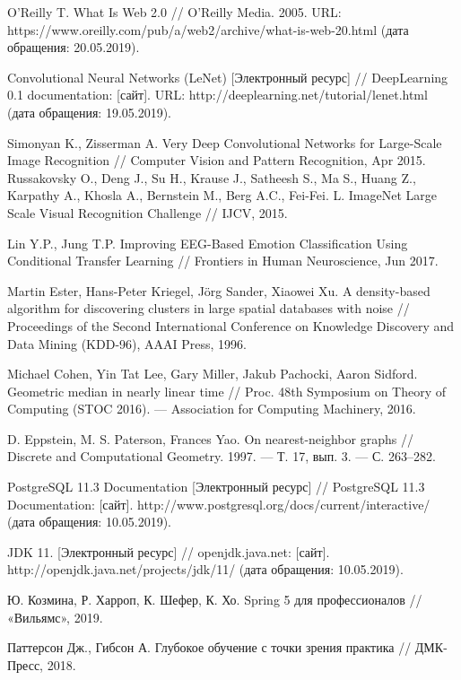 \begingroup 
\renewcommand{\section}[2]{\anonsection{Библиографический список}}
\begin{thebibliography}{00}


    O'Reilly T. What Is Web 2.0 // 
    O’Reilly Media. 
    2005. 
    URL: https://www.oreilly.com/pub/a/web2/archive/what-is-web-20.html 
    (дата обращения: 20.05.2019).

    Convolutional Neural Networks (LeNet) 
    [Электронный ресурс] // 
    DeepLearning 0.1 documentation: [сайт]. 
    URL: http://deeplearning.net/tutorial/lenet.html 
    (дата обращения: 19.05.2019).

    Simonyan K., Zisserman A. 
    Very Deep Convolutional Networks for Large-Scale Image Recognition // 
    Computer Vision and Pattern Recognition, 
    Apr 2015.
    Russakovsky O., Deng J., Su H., Krause J., Satheesh S., Ma S., Huang Z., Karpathy A., Khosla A., Bernstein M., Berg A.C., Fei-Fei. L. 
    ImageNet Large Scale Visual Recognition Challenge // 
    IJCV, 
    2015.

    Lin Y.P., Jung T.P.
    Improving EEG-Based Emotion Classification Using Conditional Transfer Learning //
    Frontiers in Human Neuroscience, 
    Jun 2017.

    Martin Ester, Hans-Peter Kriegel, Jörg Sander, Xiaowei Xu.
    A density-based algorithm for discovering clusters in large spatial databases with noise // 
    Proceedings of the Second International Conference on Knowledge Discovery and Data Mining (KDD-96),
    AAAI Press, 
    1996.

    Michael Cohen, Yin Tat Lee, Gary Miller, Jakub Pachocki, Aaron Sidford. 
    Geometric median in nearly linear time // 
    Proc. 48th Symposium on Theory of Computing (STOC 2016). — Association for Computing Machinery, 
    2016.

    D. Eppstein, M. S. Paterson, Frances Yao. 
    On nearest-neighbor graphs // 
    Discrete and Computational Geometry. 
    1997. — Т. 17, вып. 3. — С. 263–282.

    PostgreSQL 11.3 Documentation
    [Электронный ресурс] // 
    PostgreSQL 11.3 Documentation: [сайт]. 
    http://www.postgresql.org/docs/current/interactive/
    (дата обращения: 10.05.2019).

    JDK 11.
    [Электронный ресурс] // 
    openjdk.java.net: [сайт]. 
    http://openjdk.java.net/projects/jdk/11/
    (дата обращения: 10.05.2019).

    Ю. Козмина, Р. Харроп, К. Шефер, К. Хо. 
    Spring 5 для профессионалов //
    «Вильямс», 
    2019.

    Паттерсон Дж., Гибсон А. 
    Глубокое обучение с точки зрения практика //
    ДМК-Пресс, 
    2018.

\end{thebibliography}
\endgroup

\clearpage